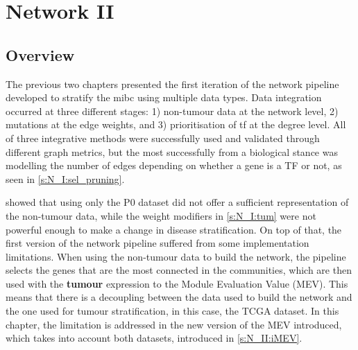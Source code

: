 
\chapter{Network II} \label{s:N_II}


\vspace{3mm}
\vspace{3mm}


\section{Overview}

The previous two chapters presented the first iteration of the network pipeline developed to stratify the \acrfull{mibc} using multiple data types. Data integration occurred at three different stages: 1) non-tumour data at the network level, 2) mutations at the edge weights, and 3) prioritisation of \acrfull{tf} at the degree level. All of three integrative methods were successfully used and validated through different graph metrics, but the most successfully from a biological stance was modelling the number of edges depending on whether a gene is a TF or not, as seen in \cref{s:N_I:sel_pruning}.


 showed that using only the P0 dataset did not offer a sufficient representation of the non-tumour data, while the weight modifiers in \cref{s:N_I:tum} were not powerful enough to make a change in disease stratification. On top of that, the first version of the network pipeline suffered from some implementation limitations. When using the non-tumour data to build the network, the pipeline selects the genes that are the most connected in the communities, which are then used with the \textbf{tumour} expression to the Module Evaluation Value (MEV). This means that there is a decoupling between the data used to build the network and the one used for tumour stratification, in this case, the TCGA dataset. In this chapter, the limitation is addressed in the new version of the MEV introduced, which takes into account both datasets, introduced in \cref{s:N_II:iMEV}.


